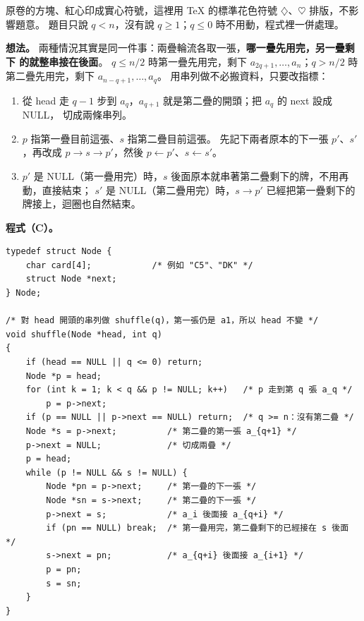 \begin{pastsoln}
原卷的方塊、紅心印成實心符號，這裡用 TeX 的標準花色符號 $\diamondsuit$、$\heartsuit$ 排版，不影響題意。
題目只說 $q < n$，沒有說 $q \ge 1$；$q \le 0$ 時不用動，程式裡一併處理。

\textbf{想法。} 兩種情況其實是同一件事：兩疊輪流各取一張，\textbf{哪一疊先用完，另一疊剩下
的就整串接在後面}。 $q \le n/2$ 時第一疊先用完，剩下 $a_{2q+1}, \ldots, a_n$；$q > n/2$ 時
第二疊先用完，剩下 $a_{n-q+1}, \ldots, a_q$。 用串列做不必搬資料，只要改指標：
\begin{enumerate}[nosep]
\item 從 head 走 $q - 1$ 步到 $a_q$，$a_{q+1}$ 就是第二疊的開頭；把 $a_q$ 的 next 設成 NULL，
切成兩條串列。
\item $p$ 指第一疊目前這張、$s$ 指第二疊目前這張。 先記下兩者原本的下一張 $p'$、$s'$，再改成
$p \to s \to p'$，然後 $p \gets p'$、$s \gets s'$。
\item $p'$ 是 NULL（第一疊用完）時，$s$ 後面原本就串著第二疊剩下的牌，不用再動，直接結束；
$s'$ 是 NULL（第二疊用完）時，$s \to p'$ 已經把第一疊剩下的牌接上，迴圈也自然結束。
\end{enumerate}

\textbf{程式（C）。}
\begin{verbatim}
typedef struct Node {
    char card[4];            /* 例如 "C5"、"DK" */
    struct Node *next;
} Node;

/* 對 head 開頭的串列做 shuffle(q)，第一張仍是 a1，所以 head 不變 */
void shuffle(Node *head, int q)
{
    if (head == NULL || q <= 0) return;
    Node *p = head;
    for (int k = 1; k < q && p != NULL; k++)   /* p 走到第 q 張 a_q */
        p = p->next;
    if (p == NULL || p->next == NULL) return;  /* q >= n：沒有第二疊 */
    Node *s = p->next;          /* 第二疊的第一張 a_{q+1} */
    p->next = NULL;             /* 切成兩疊 */
    p = head;
    while (p != NULL && s != NULL) {
        Node *pn = p->next;     /* 第一疊的下一張 */
        Node *sn = s->next;     /* 第二疊的下一張 */
        p->next = s;            /* a_i 後面接 a_{q+i} */
        if (pn == NULL) break;  /* 第一疊用完，第二疊剩下的已經接在 s 後面 */
        s->next = pn;           /* a_{q+i} 後面接 a_{i+1} */
        p = pn;
        s = sn;
    }
}
\end{verbatim}


\end{pastsoln}
